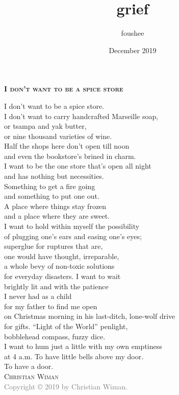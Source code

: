 \documentclass[12pt]{memoir}
\title{grief}
\author{foushee }
\date{December 2019}
\begin{document}
\thispagestyle{empty}
\textbf{\textsc{\large I don't want to be a spice store}}
\vspace{32pt}

I don't want to be a spice store.\\
I don't want to carry handcrafted Marseille soap,\\
or tsampa and yak butter,\\
or nine thousand varieties of wine.\\
Half the shops here don't open till noon\\
and even the bookstore's brined in charm.\\
I want to be the one store that's open all night\\
and has nothing but necessities.\\
Something to get a fire going\\
and something to put one out.\\
A place where things stay frozen\\
and a place where they are sweet.\\
I want to hold within myself the possibility\\
of plugging one's ears and easing one's eyes;\\
superglue for ruptures that are,\\
one would have thought, irreparable,\\
a whole bevy of non-toxic solutions\\
for everyday disasters. I want to wait\\
brightly lit and with the patience\\
I never had as a child\\
for my father to find me open\\
on Christmas morning in his last-ditch, lone-wolf drive\\
for gifts. ``Light of the World'' penlight,\\
bobblehead compass, fuzzy dice.\\
I want to hum just a little with my own emptiness\\
at 4 a.m. To have little bells above my door.\\
To have a door.\\

\vspace{12pt}
\hspace{90pt} \textsc{Christian Wiman}\\
\vfill
\noindent\footnotesize{
\textcolor{gray}{Copyright © 2019 by Christian Wiman.}}\\ %
\end{document}
